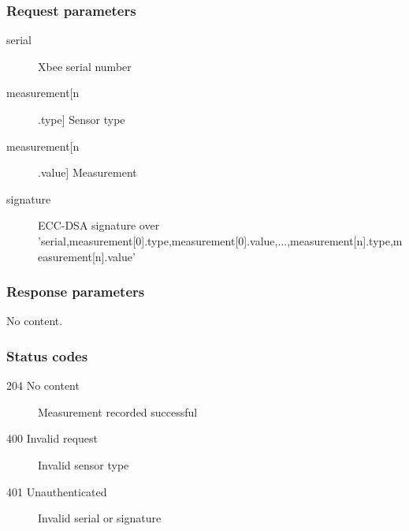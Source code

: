 \documentclass[]{scrreprt}
\begin{document}
\subsubsection*{Request parameters}
\begin{description}
\item[serial] Xbee serial number
\item[measurement[n].type] Sensor type
\item[measurement[n].value] Measurement
\item[signature] ECC-DSA signature over 'serial,measurement[0].type,measurement[0].value,...,measurement[n].type,measurement[n].value'
\end{description}

\subsubsection*{Response parameters}
No content.

\subsubsection*{Status codes}
\begin{description}
\item[204 No content] Measurement recorded successful
\item[400 Invalid request] Invalid sensor type
\item[401 Unauthenticated] Invalid serial or signature
\end{description}
\end{document}
